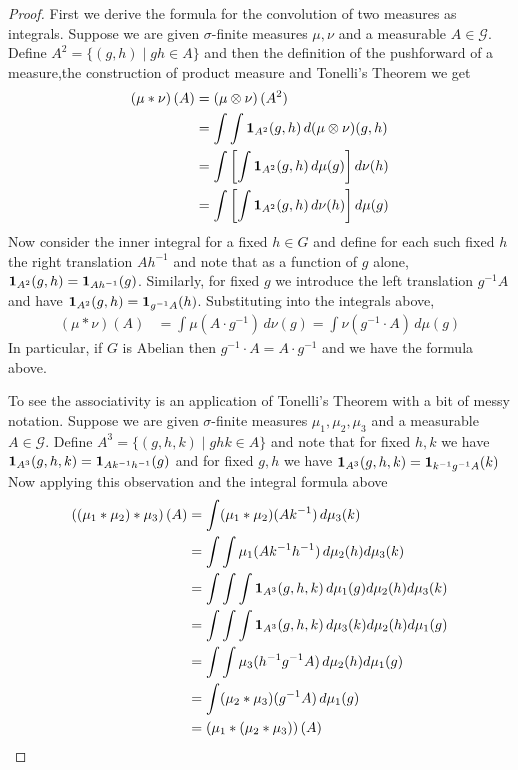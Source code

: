 \begin{proof}First we derive the formula for the convolution of two
  measures as integrals.
Suppose we are given
  $\sigma$-finite measures $\mu, \nu$ and  a measurable
  $A \in \mathcal{G}$.  Define $A^2 = \lbrace(g,h) \mid gh \in
  A\rbrace$ and then the definition of the pushforward of a
  measure,the construction of product measure and Tonelli's Theorem we get
\begin{align*}
\left(\mu*\nu \right)(A) &= \left(\mu \otimes \nu\right) (A^2) \\
&= \int
\int \textbf{1}_{A^2}(g,h) \, d(\mu\otimes \nu)(g,h) \\
&= \int \left [
\int \textbf{1}_{A^2}(g,h) \, d \mu(g) \right ]
d\nu(h) \\
&= \int \left [
\int \textbf{1}_{A^2}(g,h) \, d\nu(h) \right ]
d \mu(g) \\
\end{align*}
Now consider the inner integral for a fixed $h \in G$ and define for
each such fixed $h$ the right translation $Ah^{-1}$ and note that as a
function of $g$ alone, $\textbf{1}_{A^2}(g,h) =
\textbf{1}_{Ah^{-1}}(g)$.  Similarly, for fixed $g$ we introduce
the left translation $g^{-1}A$ and have  $\textbf{1}_{A^2}(g,h) =
\textbf{1}_{g^{-1}A}(h)$. Substituting into the integrals above, 
\begin{align*}
\left(\mu*\nu \right)(A) &= \int \mu(A\cdot g^{-1}) \, d \nu(g) = \int
\nu(g^{-1}\cdot A) \, d \mu(g)
\end{align*}
In particular, if $G$ is Abelian then $g^{-1}\cdot A = A\cdot g^{-1}$ and we have
the formula above.

To see the associativity is an application of Tonelli's
  Theorem with a bit of messy notation.  Suppose we are given
  $\sigma$-finite measures $\mu_1, \mu_2, \mu_3$ and  a measurable
  $A \in \mathcal{G}$.  Define $A^3 = \lbrace(g,h,k) \mid ghk \in
  A\rbrace$ and note that for fixed $h,k$ we have
  $\textbf{1}_{A^3}(g,h,k) = \textbf{1}_{Ak^{-1}h^{-1}}(g)$
  and for fixed $g,h$ we have $\textbf{1}_{A^3}(g,h,k) =
  \textbf{1}_{k^{-1}g^{-1}A}(k)$ 
Now applying this observation and the integral formula above
\begin{align*}
\left((\mu_1 * \mu_2)*\mu_3 \right)(A) &= \int (\mu_1 *
\mu_2)(Ak^{-1}) \, d\mu_3(k) \\
&= \int \int \mu_1(Ak^{-1}h^{-1}) \, d\mu_2(h) d\mu_3(k) \\
&= \int \int \int \textbf{1}_{A^3}(g,h,k) \, d \mu_1(g) d\mu_2(h) d\mu_3(k) \\
&= \int \int \int \textbf{1}_{A^3}(g,h,k) \, d\mu_3(k) d\mu_2(h) d \mu_1(g) \\
&= \int \int \mu_3(h^{-1} g^{-1} A) \, d\mu_2(h) d\mu_1(g) \\
&= \int  (\mu_2 *\mu_3)(g^{-1} A) \, d\mu_1(g) \\
&= \left(\mu_1 *  (\mu_2 *\mu_3) \right )(A)
\end{align*}
\end{proof}
